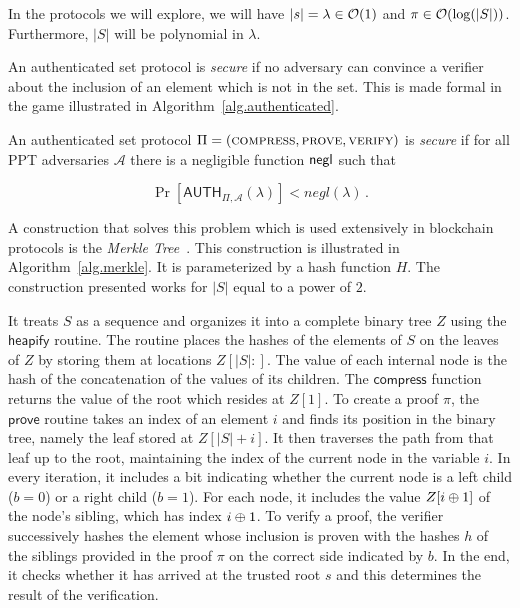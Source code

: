 In the protocols we will explore, we will have $|s| = \lambda \in \mathcal{O}(1)$ and
$\pi \in \mathcal{O}(\log(|S|))$. Furthermore, $|S|$ will be polynomial in $\lambda$.

An authenticated set protocol is \emph{secure} if no adversary can
convince a verifier about the inclusion of an element which is not in the
set. This is made formal in the game illustrated in
Algorithm~\ref{alg.authenticated}.



\begin{definition}[Security]
  An authenticated set protocol $\Pi = (\textsc{compress},\allowbreak \textsc{prove},\allowbreak \textsc{verify})$ is \emph{secure} if for all PPT adversaries $\mathcal{A}$
  there is a negligible function $\mathsf{negl}$ such that

  \[
    \Pr[\textsf{AUTH}_{\Pi,\mathcal{A}}(\lambda)] < negl(\lambda)\,.
  \]
\end{definition}

A construction that solves this problem which is used extensively in blockchain
protocols is the \emph{Merkle Tree}~\cite{merkle}. This construction is
illustrated in Algorithm~\ref{alg.merkle}. It is parameterized by a hash
function $H$. The construction presented works for $|S|$ equal to a power of
$2$.

It treats $S$ as a sequence and organizes it into a complete binary tree $Z$
using the $\textsf{heapify}$ routine. The routine places the hashes of the
elements of $S$ on the leaves of $Z$ by storing them at locations $Z[|S|{:}]$.
The value of each internal node is the hash of the concatenation of the values
of its children. The $\textsf{compress}$ function returns the value of the root
which resides at $Z[1]$. To create a proof $\pi$, the $\textsf{prove}$ routine
takes an index of an element $i$ and finds its position in the binary tree,
namely the leaf stored at $Z[|S| + i]$. It then traverses the path from that
leaf up to the root, maintaining the index of the current node in the variable
$i$. In every iteration, it includes a bit indicating whether the current node
is a left child ($b = 0$) or a right child ($b = 1$). For each node, it includes
the value $Z[i \oplus 1]$ of the node's sibling, which has index $i \oplus 1$. To
verify a proof, the verifier successively hashes the element whose inclusion is
proven with the hashes $h$ of the siblings provided in the proof $\pi$ on the
correct side indicated by $b$. In the end, it checks whether it has arrived at
the trusted root $s$ and this determines the result of the verification.

